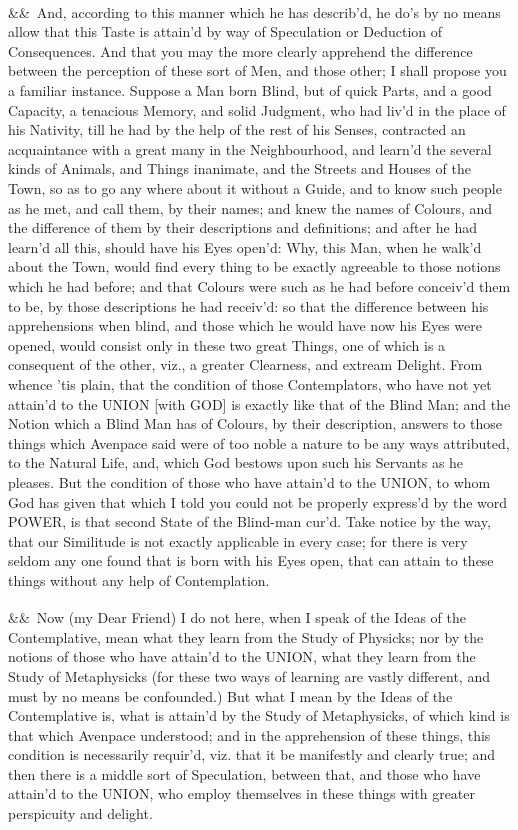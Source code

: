 \documentclass[12pt]{article}
\newcommand{\para}[1][]{\par\noindent\ifx&#1&\else\textsuperscript{\footnotesize #1}~\fi}
\begin{document}
\para And, according to this manner which he has describ'd, he do's by no means allow that this Taste is attain'd by way of Speculation or Deduction of Consequences. And that you may the more clearly apprehend the difference between the perception of these sort of Men, and those other; I shall propose you a familiar instance. Suppose a Man born Blind, but of quick Parts, and a good Capacity, a tenacious Memory, and solid Judgment, who had liv'd in the place of his Nativity, till he had by the help of the rest of his Senses, contracted an acquaintance with a great many in the Neighbourhood, and learn'd the several kinds of Animals, and Things inanimate, and the Streets and Houses of the Town, so as to go any where about it without a Guide, and to know such people as he met, and call them, by their names; and knew the names of Colours, and the difference of them by their descriptions and definitions; and after he had learn'd all this, should have his Eyes open'd: Why, this Man, when he walk'd about the Town, would find every thing to be exactly agreeable to those notions which he had before; and that Colours were such as he had before conceiv'd them to be, by those descriptions he had receiv'd: so that the difference between his apprehensions when blind, and those which he would have now his Eyes were opened, would consist only in these two great Things, one of which is a consequent of the other, viz., a greater Clearness, and extream Delight. From whence 'tis plain, that the condition of those Contemplators, who have not yet attain'd to the UNION [with GOD] is exactly like that of the Blind Man; and the Notion which a Blind Man has of Colours, by their description, answers to those things which Avenpace said were of too noble a nature to be any ways attributed, to the Natural Life, and, which God bestows upon such his Servants as he pleases. But the condition of those who have attain'd to the UNION, to whom God has given that which I told you could not be properly express'd by the word POWER, is that second State of the Blind-man cur'd. Take notice by the way, that our Similitude is not exactly applicable in every case; for there is very seldom any one found that is born with his Eyes open, that can attain to these things without any help of Contemplation.

\para Now (my Dear Friend) I do not here, when I speak of the Ideas of the Contemplative, mean what they learn from the Study of Physicks; nor by the notions of those who have attain'd to the UNION, what they learn from the Study of Metaphysicks (for these two ways of learning are vastly different, and must by no means be confounded.) But what I mean by the Ideas of the Contemplative is, what is attain'd by the Study of Metaphysicks, of which kind is that which Avenpace understood; and in the apprehension of these things, this condition is necessarily requir'd, viz. that it be manifestly and clearly true; and then there is a middle sort of Speculation, between that, and those who have attain'd to the UNION, who employ themselves in these things with greater perspicuity and delight.
\end{document}
